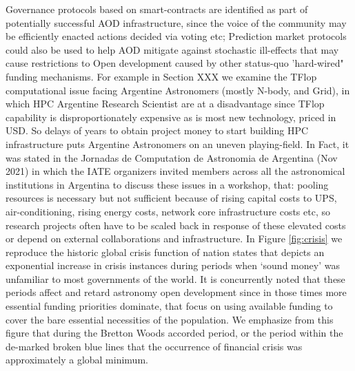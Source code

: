 \documentclass[final,5p,times,twocolumn,authoryear]{elsarticle}
\begin{document}

Governance protocols based on smart-contracts are identified as part of potentially successful AOD infrastructure, since the voice of the community may be efficiently enacted  actions decided via voting etc; Prediction market protocols could also be used to help AOD mitigate against stochastic ill-effects that may cause restrictions to Open development caused by other status-quo 'hard-wired" funding mechanisms. For example in Section XXX we examine the TFlop computational issue facing Argentine Astronomers (mostly N-body, and Grid), in which HPC Argentine Research Scientist are at a disadvantage since TFlop capability is disproportionately expensive as is most new technology, priced in USD. So delays of years to obtain project money to start building HPC infrastructure puts Argentine Astronomers on an uneven playing-field. In Fact, it was stated in the Jornadas de Computation de Astronomia de Argentina (Nov 2021)  in which the IATE organizers invited members across all the astronomical institutions in Argentina to discuss these issues in a workshop, that: pooling resources is necessary but not sufficient because of rising capital costs to UPS, air-conditioning, rising energy costs, network core infrastructure costs etc, so research projects often have to be scaled back in response of these elevated costs or depend on external  collaborations and infrastructure. In Figure \ref{fig:crisis} we reproduce the historic global crisis function of nation states that depicts an exponential increase in crisis instances during periods when `sound money' was  unfamiliar to most governments of the world. It is concurrently noted that these periods affect and retard astronomy open development since in those times more essential funding priorities dominate, that focus on using available funding to cover the bare essential necessities of the population. We emphasize from this figure that during the Bretton Woods accorded period, or the period within the de-marked broken blue lines that the occurrence of financial crisis was approximately a global minimum. 
\end{document}
